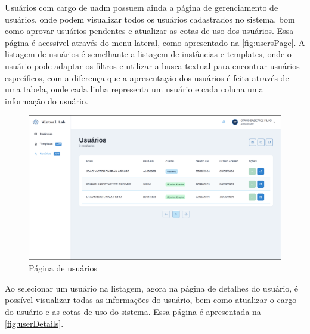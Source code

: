 Usuários com cargo de \gls{uadm} possuem ainda a página de gerenciamento de usuários, onde podem visualizar todos os usuários cadastrados no sistema, bom como aprovar usuários pendentes e atualizar as cotas de uso dos usuários. Essa página é acessível através do menu lateral, como apresentado na \autoref{fig:usersPage}. A listagem de usuários é semelhante a listagem de instâncias e templates, onde o usuário pode adaptar os filtros e utilizar a busca textual para encontrar usuários específicos, com a diferença que a apresentação dos usuários é feita através de uma tabela, onde cada linha representa um usuário e cada coluna uma informação do usuário.

\begin{figure}[H]
\caption{Página de usuários}
\label{fig:usersPage}
\includegraphics[width=\textwidth]{capitulos/3-resultados/files/users.png}
\end{figure}

Ao selecionar um usuário na listagem, agora na página de detalhes do usuário, é possível visualizar todas as informações do usuário, bem como atualizar o cargo do usuário e as cotas de uso do sistema. Essa página é apresentada na \autoref{fig:userDetails}.

